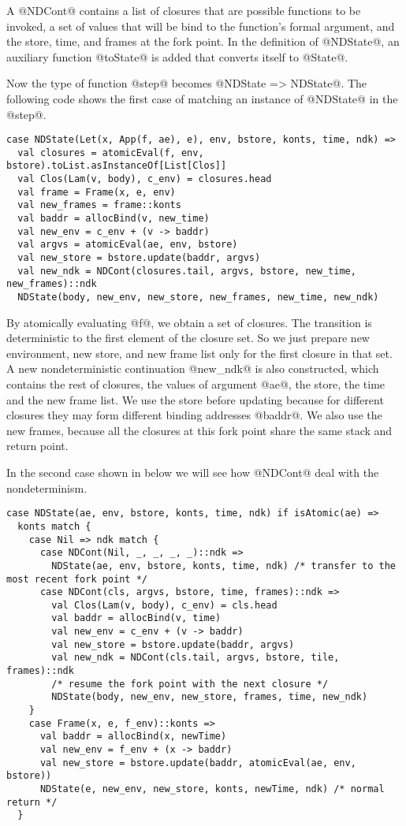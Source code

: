 \documentclass[acmsmall,review,anonymous]{acmart}\settopmatter{printfolios=true,printccs=false,printacmref=false}
\begin{document}
A @NDCont@ contains a list of closures that are possible functions to be invoked,
a set of values that will be bind to the function's formal argument,
and the store, time, and frames at the fork point.
In the definition of @NDState@, an auxiliary function @toState@ is added that
converts itself to @State@.

Now the type of function @step@ becomes @NDState => NDState@.
The following code shows the first case of matching an instance of @NDState@ in
the @step@.

\begin{lstlisting}
case NDState(Let(x, App(f, ae), e), env, bstore, konts, time, ndk) =>
  val closures = atomicEval(f, env, bstore).toList.asInstanceOf[List[Clos]]
  val Clos(Lam(v, body), c_env) = closures.head
  val frame = Frame(x, e, env)
  val new_frames = frame::konts
  val baddr = allocBind(v, new_time)
  val new_env = c_env + (v -> baddr)
  val argvs = atomicEval(ae, env, bstore)
  val new_store = bstore.update(baddr, argvs)
  val new_ndk = NDCont(closures.tail, argvs, bstore, new_time, new_frames)::ndk
  NDState(body, new_env, new_store, new_frames, new_time, new_ndk)
\end{lstlisting}

By atomically evaluating @f@, we obtain a set of closures.
The transition is deterministic to the first element of the closure set.
So we just prepare new environment, new store, and new frame list only for the
first closure in that set.
A new nondeterministic continuation @new_ndk@ is also constructed,
which contains the rest of closures, the values of argument @ae@, the store,
the time and the new frame list.
We use the store before updating because for different closures they may form
different binding addresses @baddr@.
We also use the new frames, because all the closures at this fork point share
the same stack and return point.

In the second case shown in below we will see how @NDCont@ deal with
the nondeterminism.

\begin{lstlisting}
case NDState(ae, env, bstore, konts, time, ndk) if isAtomic(ae) =>
  konts match {
    case Nil => ndk match {
      case NDCont(Nil, _, _, _, _)::ndk =>
        NDState(ae, env, bstore, konts, time, ndk) /* transfer to the most recent fork point */
      case NDCont(cls, argvs, bstore, time, frames)::ndk =>
        val Clos(Lam(v, body), c_env) = cls.head
        val baddr = allocBind(v, time)
        val new_env = c_env + (v -> baddr)
        val new_store = bstore.update(baddr, argvs)
        val new_ndk = NDCont(cls.tail, argvs, bstore, tile, frames)::ndk
        /* resume the fork point with the next closure */
        NDState(body, new_env, new_store, frames, time, new_ndk)
    }
    case Frame(x, e, f_env)::konts =>
      val baddr = allocBind(x, newTime)
      val new_env = f_env + (x -> baddr)
      val new_store = bstore.update(baddr, atomicEval(ae, env, bstore))
      NDState(e, new_env, new_store, konts, newTime, ndk) /* normal return */
  }
\end{lstlisting}
\end{document}
